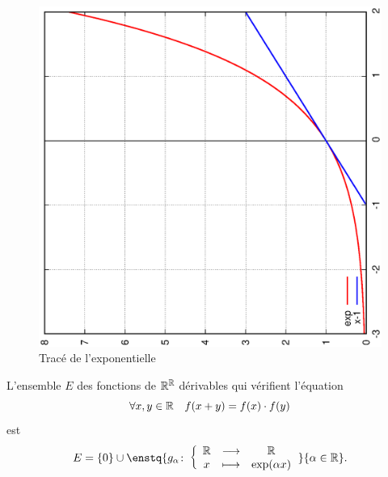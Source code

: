 \begin{figure}
  \centering
  \includegraphics[scale=0.4,angle=-90]{exp.ps}
  \caption{Tracé de l'exponentielle}
  \label{fig:traceexp}
\end{figure}
%
\begin{theo}
  L'ensemble $E$ des fonctions de $\mathbb{R}^{\mathbb{R}}$ dérivables qui vérifient l'équation
  \begin{equation}
    \label{eq:foncexp}
    \forall x, y \in \mathbb{R} \quad f(x+y)=f(x) \cdot f(y) 
  \end{equation}
  est 
  \begin{equation} 
    E=\left\{0\right\} \cup \enstq{\fonction{g_{\alpha}}{\R}{\R}{x}{\exp(\alpha x)}}{\alpha \in \R}.
  \end{equation}
\end{theo}
